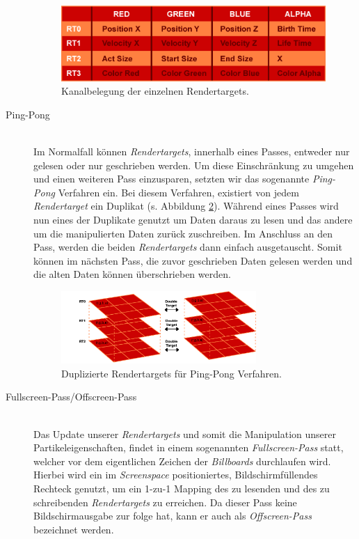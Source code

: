 \begin{Spacing}{\mylinespace}
\begin{description}
\begin{figure}[h!]
	\centering
	\vspace*{15px}
	\includegraphics[width=380px]{graphics/RendertargetsChannels.png}
	\caption{Kanalbelegung der einzelnen Rendertargets.}
	\label{fig:RTCahnnels}
\end{figure}	
	
	\item[Ping-Pong] \hfill \\
	Im Normalfall können \textit{Rendertargets}, innerhalb eines Passes, entweder nur gelesen oder nur geschrieben werden. Um diese Einschränkung zu umgehen und einen weiteren Pass einzusparen, setzten wir das sogenannte \textit{Ping-Pong} Verfahren ein. Bei diesem Verfahren, existiert von jedem \textit{Rendertarget} ein Duplikat (s. Abbildung \ref{fig:DoubleTarget}). Während eines Passes wird nun eines der Duplikate genutzt um Daten daraus zu lesen und das andere um die manipulierten Daten zurück zuschreiben. Im Anschluss an den Pass, werden die beiden \textit{Rendertargets} dann einfach ausgetauscht. Somit können im nächsten Pass, die zuvor geschrieben Daten gelesen werden und die alten Daten können überschrieben werden.
	
\begin{figure}[h!]
	\centering
	\vspace*{10px}
	\includegraphics[width=280px]{graphics/DoubleTargets2.png}
	\caption{Duplizierte Rendertargets für Ping-Pong Verfahren.}
	\label{fig:DoubleTarget}
\end{figure}

	\item[Fullscreen-Pass/Offscreen-Pass] \hfill \\
Das Update unserer \textit{Rendertargets} und somit die Manipulation unserer Partikeleigenschaften, findet in einem sogenannten \textit{Fullscreen-Pass} statt, welcher vor dem eigentlichen Zeichen der \textit{Billboards} durchlaufen wird. Hierbei wird ein im \textit{Screenspace} positioniertes, Bildschirmfüllendes Rechteck genutzt, um ein 1-zu-1 Mapping des zu lesenden und des zu schreibenden \textit{Rendertargets} zu erreichen. Da dieser Pass keine Bildschirmausgabe zur folge hat, kann er auch als \textit{Offscreen-Pass} bezeichnet werden.


\end{description}
\end{Spacing}
